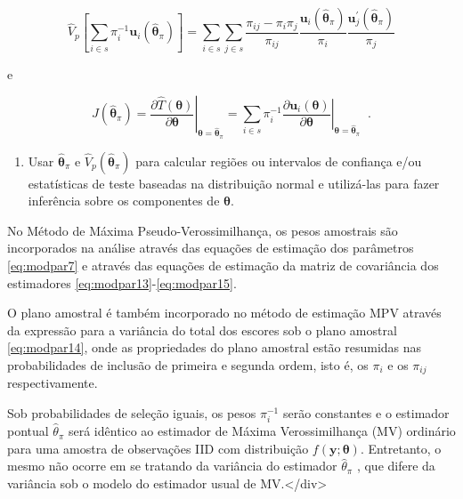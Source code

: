 \documentclass[]{book}
\providecommand{\tightlist}{%
  \setlength{\itemsep}{0pt}\setlength{\parskip}{0pt}}
\theoremstyle{definition}
\theoremstyle{definition}
\theoremstyle{definition}
\theoremstyle{remark}
\let\BeginKnitrBlock\begin \let\EndKnitrBlock\end
\begin{document}
\begin{equation}
\hat{V}_{p}\left[ \sum\limits_{i\in s}\pi _{i}^{-1}\mathbf{u}_{i}\left( 
\mathbf{\hat{\theta}}_{\pi }\right) \right] =\sum\limits_{i\in
s}\sum\limits_{j\in s}\frac{\pi _{ij}-\pi _{i}\pi _{j}}{\pi _{ij}}
\frac{\mathbf{u}_{i}\left(\mathbf{\hat{\theta}}_{\pi }\right)}{\pi _{i}} 
\frac{\mathbf{u}_{j}^{\prime}\left(\mathbf{\hat{\theta}}_{\pi}\right)}{\pi _{j}} 
\label{eq:modpar14}
\end{equation}

e

\begin{equation}
\hat{J}\left( \mathbf{\hat{\theta}}_{\pi }\right) =\left. \frac{\partial 
\widehat{T}\left( \mathbf{\theta }\right) }{\partial \mathbf{\theta }}
\right| _{\mathbf{\theta }=\mathbf{\hat{\theta}}_{\pi }}=\sum\limits_{i\in
s}\pi _{i}^{-1}\left. \frac{\partial \mathbf{u}_{i}\left( \mathbf{\theta }
\right) }{\partial \mathbf{\theta }}\right| _{\mathbf{\theta }=\mathbf{\hat{
\theta}}_{\pi }}\;\;.  
\label{eq:modpar15}
\end{equation}

\begin{enumerate}
\def\labelenumi{\arabic{enumi}.}
\setcounter{enumi}{2}
\tightlist
\item
  Usar \(\mathbf{\hat{\theta}}_{\pi }\) e
  \(\hat{V}_{p}\left( \mathbf{\hat{\theta}}_{\pi }\right)\) para
  calcular regiões ou intervalos de confiança e/ou estatísticas de teste
  baseadas na distribuição normal e utilizá-las para fazer inferência
  sobre os componentes de \(\mathbf{\theta}\).
\end{enumerate}

\BeginKnitrBlock{remark}
{}No Método de Máxima
Pseudo-Verossimilhança, os pesos amostrais são incorporados na análise
através das equações de estimação dos parâmetros \eqref{eq:modpar7} e
através das equações de estimação da matriz de covariância dos
estimadores \eqref{eq:modpar13}-\eqref{eq:modpar15}.
\EndKnitrBlock{remark}

\BeginKnitrBlock{remark}
{}O plano amostral é também incorporado no
método de estimação MPV através da expressão para a variância do total
dos escores sob o plano amostral \eqref{eq:modpar14}, onde as propriedades
do plano amostral estão resumidas nas probabilidades de inclusão de
primeira e segunda ordem, isto é, os \(\pi _{i}\) e os \(\pi _{ij}\)
respectivamente.
\EndKnitrBlock{remark}

\BeginKnitrBlock{remark}
{}Sob probabilidades de seleção iguais, os
pesos \(\pi _{i}^{-1}\) serão constantes e o estimador pontual
\(\hat{\theta}_{\pi }\) será idêntico ao estimador de Máxima
Verossimilhança (MV) ordinário para uma amostra de observações IID com
distribuição \(f\left(\mathbf{y;\theta }\right)\). Entretanto, o mesmo
não ocorre em se tratando da variância do estimador
\(\hat{\theta}_{\pi }\) , que difere da variância sob o modelo do
estimador usual de MV.\medskip</div>\EndKnitrBlock{remark}
\end{document}
